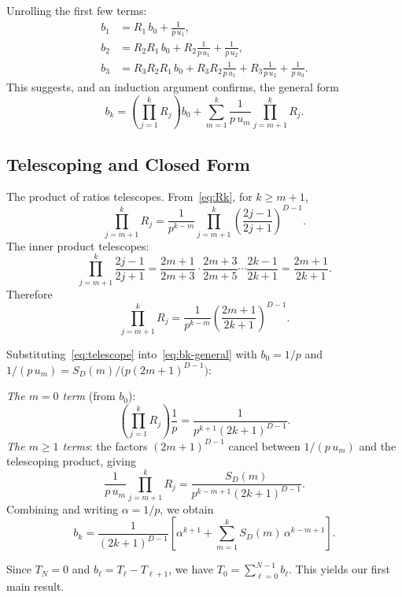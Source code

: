 \documentclass[conference]{IEEEtran}
\begin{document}
Unrolling the first few terms:
\begin{align*}
b_1 &= R_1\,b_0 + \frac{1}{p\,u_1},\\[3pt]
b_2 &= R_2 R_1\,b_0 + R_2\frac{1}{p\,u_1} + \frac{1}{p\,u_2},\\[3pt]
b_3 &= R_3 R_2 R_1\,b_0 + R_3 R_2\frac{1}{p\,u_1}
  + R_3\frac{1}{p\,u_2} + \frac{1}{p\,u_3}.
\end{align*}
This suggests, and an induction argument confirms, the general form
\begin{equation}
\label{eq:bk-general}
b_k = \left(\prod_{j=1}^{k} R_j\right) b_0
+ \sum_{m=1}^{k} \frac{1}{p\,u_m}\prod_{j=m+1}^{k} R_j.
\end{equation}

\subsection{Telescoping and Closed Form}

The product of ratios telescopes.
From~\eqref{eq:Rk}, for $k \ge m+1$,
\[
\prod_{j=m+1}^{k} R_j
= \frac{1}{p^{k-m}} \prod_{j=m+1}^{k}
  \left(\frac{2j-1}{2j+1}\right)^{D-1}.
\]
The inner product telescopes:
\[
\prod_{j=m+1}^{k} \frac{2j-1}{2j+1}
= \frac{2m+1}{2m+3}\cdot\frac{2m+3}{2m+5}\cdots\frac{2k-1}{2k+1}
= \frac{2m+1}{2k+1}.
\]
Therefore
\begin{equation}
\label{eq:telescope}
\prod_{j=m+1}^{k} R_j
= \frac{1}{p^{k-m}}\left(\frac{2m+1}{2k+1}\right)^{D-1}.
\end{equation}

Substituting~\eqref{eq:telescope} into~\eqref{eq:bk-general} with
$b_0 = 1/p$ and $1/(p\,u_m) = S_D(m)/\bigl(p(2m+1)^{D-1}\bigr)$:

\emph{The $m=0$ term} (from $b_0$):
\[
\left(\prod_{j=1}^{k} R_j\right)\frac{1}{p}
= \frac{1}{p^{k+1}(2k+1)^{D-1}}.
\]
\emph{The $m \ge 1$ terms}: the factors $(2m+1)^{D-1}$ cancel between
$1/(p\,u_m)$ and the telescoping product, giving
\[
\frac{1}{p\,u_m}\prod_{j=m+1}^{k} R_j
= \frac{S_D(m)}{p^{k-m+1}(2k+1)^{D-1}}.
\]
Combining and writing $\alpha = 1/p$, we obtain
\begin{equation}
\label{eq:bk-closed}
\boxed{
b_k = \frac{1}{(2k+1)^{D-1}}
\left[\alpha^{k+1} + \sum_{m=1}^{k} S_D(m)\,\alpha^{k-m+1}\right].
}
\end{equation}

Since $T_N = 0$ and $b_\ell = T_\ell - T_{\ell+1}$, we have
$T_0 = \sum_{\ell=0}^{N-1} b_\ell$.
This yields our first main result.
\end{document}
